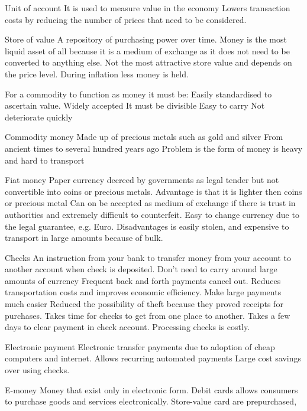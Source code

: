 \documentclass[12pt]{examnotes}
\begin{document}
 Unit of account 
\rna It is used to measure value in the economy
\rna Lowers transaction costs by reducing the number of prices that need to be considered.

 Store of value
\rna A repository of purchasing power over time.
\rna Money is the most liquid asset of all because it is a medium of exchange as it does not need to be converted to anything else.
\rna Not the most attractive store value and depends on the price level.
\rna During inflation less money is held.

\vspace{6pt}
\ra For a commodity to function as money it must be:
 Easily standardised to ascertain value.
 Widely accepted
 It must be divisible
 Easy to carry
 Not deteriorate quickly

 Commodity money
\rna Made up of precious metals such as gold and silver
\rna From ancient times to several hundred years ago
\rna Problem is the form of money is heavy and hard to transport
 
 Fiat money
\rna Paper currency decreed by governments as legal tender but not convertible into coins or precious metals.
\rna Advantage is that it is lighter then coins or precious metal
\rna  Can on be accepted as medium of exchange if there is trust in authorities and extremely difficult to counterfeit.
\rna Easy to change currency due to the legal guarantee, e.g. Euro.
\rna Disadvantages is easily stolen, and expensive to transport in large amounts because of bulk.

 Checks
\rna An instruction from your bank to transfer money from your account to another account when check is deposited.
\rna Don't need to carry around large amounts of currency
\rna Frequent back and forth payments cancel out.
\rna Reduces transportation costs and improves economic efficiency.
\rna Make large payments much easier
\rna Reduced the possibility of theft because they proved receipts for purchases.
\rna Takes time for checks to get from one place to another.
\rna Takes a few days to clear payment in check account.
\rna Processing checks is costly.

 Electronic payment
\rna Electronic transfer payments due to adoption of cheap computers and internet.
\rna Allows recurring automated payments
\rna Large cost savings over using checks.

 E-money
\rna Money that exist only in electronic form.
\rna Debit cards allows consumers to purchase goods and services electronically.
\rna Store-value card are prepurchased,
\end{document}
